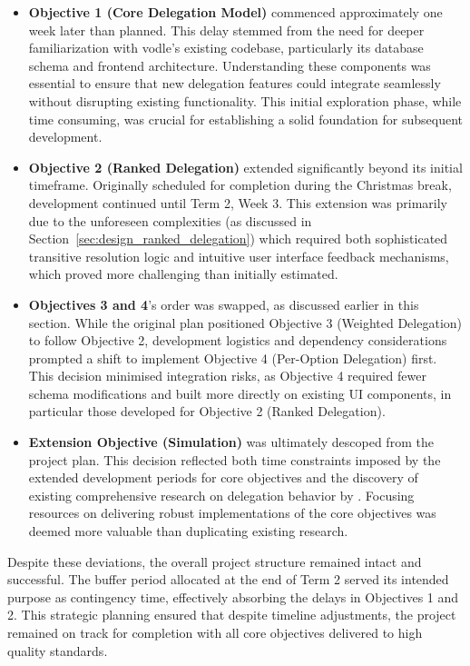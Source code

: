 \begin{itemize}
    \item \textbf{Objective 1 (Core Delegation Model)} commenced approximately one week later than planned. This delay stemmed from the need for deeper familiarization with vodle's existing codebase, particularly its database schema and frontend architecture. Understanding these components was essential to ensure that new delegation features could integrate seamlessly without disrupting existing functionality. This initial exploration phase, while time consuming, was crucial for establishing a solid foundation for subsequent development.
    \item \textbf{Objective 2 (Ranked Delegation)} extended significantly beyond its initial timeframe. Originally scheduled for completion during the Christmas break, development continued until Term 2, Week 3. This extension was primarily due to the unforeseen complexities (as discussed in Section~\ref{sec:design_ranked_delegation}) which required both sophisticated transitive resolution logic and intuitive user interface feedback mechanisms, which proved more challenging than initially estimated.
    \item \textbf{Objectives 3 and 4}'s order was swapped, as discussed earlier in this section. While the original plan positioned Objective 3 (Weighted Delegation) to follow Objective 2, development logistics and dependency considerations prompted a shift to implement Objective 4 (Per-Option Delegation) first. This decision minimised integration risks, as Objective 4 required fewer schema modifications and built more directly on existing UI components, in particular those developed for Objective 2 (Ranked Delegation).
    \item \textbf{Extension Objective (Simulation)} was ultimately descoped from the project plan. This decision reflected both time constraints imposed by the extended development periods for core objectives and the discovery of existing comprehensive research on delegation behavior by \citet{brill_liquid_2021}. Focusing resources on delivering robust implementations of the core objectives was deemed more valuable than duplicating existing research.
\end{itemize}

Despite these deviations, the overall project structure remained intact and successful. The buffer period allocated at the end of Term 2 served its intended purpose as contingency time, effectively absorbing the delays in Objectives 1 and 2. This strategic planning ensured that despite timeline adjustments, the project remained on track for completion with all core objectives delivered to high quality standards.

